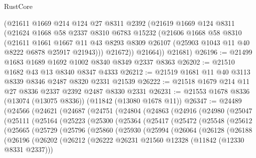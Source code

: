 \begin{lexlean}{RustCore}
\begin{coremodule}
        (@21611
          @1669
          @214
          @124
          @27
          @8311
          @2392
          (@21619
            @1669
            @124
            @8311
            (@21624
              @1668
              @58
              @2337
              @8310
              @6783
              @15232
              (@21606
                @1668
                @58
                @8310
                (@21611
                  @1661
                  @1667
                  @11
                  @43
                  @8293
                  @8309
                  @26107
                  (@25903 @1043 @11 @40 @8222 @6878 @25917 @21943)))
              @21672))
          @21664))
      @21681)
@26196 := @21499 @1683 @1689 @1692 @1002 @8340 @8349 @2337 @8363
@26202 := @21510 @1682 @43 @13 @8340 @8347 @4333
@26212 := @21519 @1681 @11 @40 @3113 @8339 @8346 @2487 @8320 @2331 @21539
@26222 := @21518 @1679 @214 @11 @27 @8336 @2337 @2392 @2487 @8330 @2331
@26231 := @21553 @1678 @8336 (@13074 (@13075 @8336)) (@11842 (@13080 @1678 @11))
@26347 := @24489
    (@24566
      (@24621
        (@24687
          (@24751
            (@24804
              (@24863
                (@24916
                  (@24980
                    (@25047
                      (@25111
                        (@25164
                          (@25223
                            (@25300
                              (@25364
                                (@25417
                                  (@25472
                                    (@25548
                                      (@25612
                                        (@25665
                                          (@25729
                                            (@25796
                                              (@25860
                                                (@25930
                                                  (@25994
                                                    (@26064
                                                      (@26128
                                                        (@26188
                                                          (@26196
                                                            (@26202
                                                              (@26212
                                                                (@26222
                                                                  @26231
                                                                  @21560
                                                                  @12328
                                                                  (@11842 (@12330 @8331 @2337)))

\end{coremodule}
\end{lexlean}
